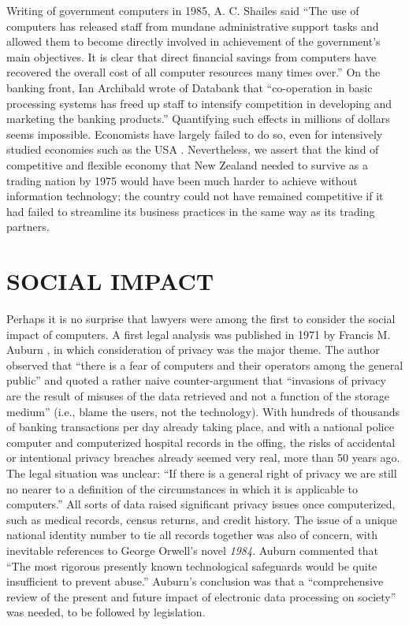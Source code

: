 \documentclass{IEEEcsmag}
\begin{document}
Writing of government computers in 1985, A. C. Shailes \cite{Shailes} said
“The use of computers has released staff from mundane administrative support tasks and
allowed them to become directly involved in achievement of the government’s main objectives.
It is clear that direct financial savings from computers have recovered the overall cost of all
computer resources many times over.” On the banking front, Ian Archibald \cite{Archibald} wrote
of Databank that “co-operation in basic processing systems has freed up staff to intensify competition
in developing and marketing the banking products.” Quantifying such effects in millions of dollars
seems impossible. Economists have largely failed to do so, even for intensively studied
economies such as the USA \cite{Oliner-1994}.
\cbstart
Nevertheless, we assert that the kind of competitive
and flexible economy that New Zealand needed to survive as a trading nation by 1975 would have been
much harder to achieve without information technology; the country could not have remained
competitive if it had failed to streamline its business practices in the same way as its trading partners.
\cbend
\vspace*{-8pt}
\section{SOCIAL IMPACT}
Perhaps it is no surprise that lawyers were among the first to consider the social impact of computers.
A first legal analysis was published in 1971 by Francis M. Auburn \cite{Auburn1971}, in which consideration of privacy
was the major theme. The author observed that “there is a fear of computers and their operators among the
general public” and quoted a rather naive counter-argument that “invasions of privacy are the result of misuses
of the data retrieved and not a function of the storage medium” (i.e., blame the users, not the technology).
With hundreds of thousands of banking transactions per day already taking place, and with a national police
computer and computerized hospital records in the offing, the risks of accidental or intentional privacy breaches
already seemed very real, more than 50 years ago. The legal situation was unclear: “If there is a general right of
privacy we are still no nearer to a definition of the circumstances in which it is applicable to computers.” All sorts
of data raised significant privacy issues once computerized, such as medical records, census returns, and credit history.
The issue of a unique national identity number to tie all records together was also of concern, with
inevitable references to George Orwell’s novel \textit{1984}. Auburn commented that “The most
rigorous presently known technological safeguards would be quite insufficient to
prevent abuse.” Auburn’s conclusion was that a “comprehensive review of the present and future
impact of electronic data processing on society” was needed, to be followed by legislation.
\end{document}
